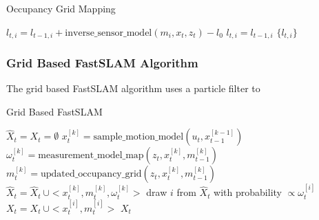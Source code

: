 \documentclass[a4paper]{article}
\begin{document}
\begin{algorithm}[h]
\caption{Occupancy Grid Mapping}
\begin{algorithmic}[1]
		\State $l_{t,i} = l_{t-1,i} + \text{inverse\_sensor\_model}(m_i, x_t, z_t) - l_0$
	\Else
		\State $l_{t,i} = l_{t-1,i}$
	\EndIf
\EndFor
\Return $\{ l_{t,i} \}$
\EndProcedure
\end{algorithmic}
\end{algorithm}

\newpage

\subsubsection{Grid Based FastSLAM Algorithm}
The grid based FastSLAM algorithm uses a particle filter to 

\begin{algorithm}[h]
\caption{Grid Based FastSLAM}
\begin{algorithmic}[1]
\State $\hat{X}_t = X_t = \emptyset$
	\State $x_t^{[k]} = \text{sample\_motion\_model}(u_t, x_{t-1}^{[k-1]})$
	\State $\omega_t^{[k]} = \text{measurement\_model\_map}(z_t, x_t^{[k]}, m_{t-1}^{[k]})$
	\State $m_t^{[k]} = \text{updated\_occupancy\_grid}(z_t, x_t^{[k]}, m_{t-1}^{[k]})$
	\State $\hat{X}_t = \hat{X}_t \ \cup <x_t^{[k]}, m_t^{[k]}, \omega_t^{[k]}>$
\EndFor
{}
	\State draw $i$ from $\hat{X}_t$ with probability $\propto \omega_t^{[i]}$
	\State $X_t = X_t \ \cup <x_t^{[i]}, m_t^{[i]}>$
\EndFor
\Return $X_t$
\EndProcedure
\end{algorithmic}
\end{algorithm}
\end{document}
